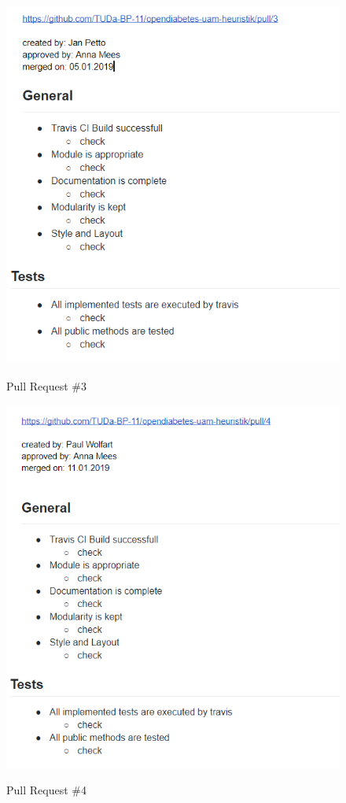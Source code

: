 \documentclass[accentcolor=tud0b,12pt,paper=a4]{tudreport}
\begin{document}
\begin{figure}[h]
\centering
\caption{Pull Request \#3}
\includegraphics[width=\textwidth,height=\textheight,keepaspectratio]{pr-3}
\label{pr:3}
\end{figure}

\begin{figure}[h]
\centering
\caption{Pull Request \#4}
\includegraphics[width=\textwidth,height=\textheight,keepaspectratio]{pr-4}
\label{pr:4}
\end{figure}
\end{document}

